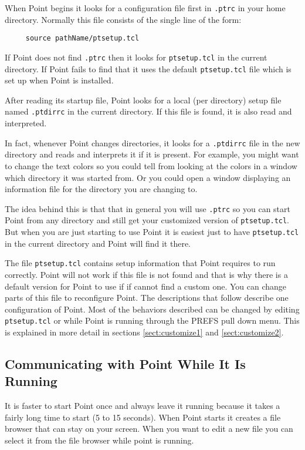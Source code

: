 When Point begins it looks for a configuration file first in {\tt .ptrc}
in your home directory.
Normally this file consists of the single line of the form:
\begin{verbatim}
     source pathName/ptsetup.tcl
\end{verbatim}
If Point does not find {\tt .ptrc} then it looks for {\tt ptsetup.tcl}
in the current directory.
If Point fails to find that it uses the default {\tt ptsetup.tcl}
file which is set up when Point is installed.

After reading its startup file, Point looks for a local (per directory)
setup file named {\tt .ptdirrc} in the current directory.
If this file is found, it is also read and interpreted.

In fact, whenever Point changes directories, it looks for a {\tt .ptdirrc}
file in the new directory and reads and interprets it if it is present.
For example, you might want to change the text colors so you could tell
from looking at the colors in a window which directory it was started from.
Or you could open a window displaying an information file for the directory
you are changing to.

The idea behind this is that that in general you will use
{\tt .ptrc} so you can start Point from any directory
and still get your customized version of {\tt ptsetup.tcl}.
But when you are just starting to use Point it is easiest just
to have {\tt ptsetup.tcl} in the current directory and Point will
find it there.

The file {\tt ptsetup.tcl} contains setup information that 
Point requires to run correctly.
Point will not work if this file is not found
and that is why there is a default version for Point
to use if if cannot find a custom one.
You can change parts of this file to reconfigure Point.
The descriptions that follow describe one configuration of Point.
Most of the behaviors described can be changed by editing {\tt ptsetup.tcl}
or while Point is running through the PREFS pull down menu.
This is explained in more detail
in sections \ref{sect:customize1} and \ref{sect:customize2}.



\subsection{Communicating with Point While It Is Running}

It is faster to start Point once and always leave it running
because it takes a fairly long time to start (5 to 15 seconds).
When Point starts it creates a file browser that can stay on
your screen.
When you want to edit a new file you can select it from the
file browser while point is running.

